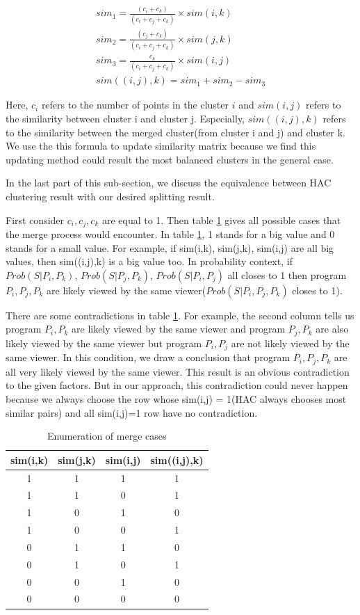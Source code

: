 \begin{equation}
\begin{split}
sim_1 = \frac{(c_i+c_k)}{(c_i+c_j+c_k)}\times sim(i,k) \\
sim_2 = \frac{(c_j+c_k)}{(c_i+c_j+c_k)}\times sim(j,k) \\
sim_3 = \frac{c_k}{(c_i+c_j+c_k)}\times sim(i,j) \\
sim((i,j),k) = sim_1 + sim_2 - sim_3
\end{split}
\end{equation}

Here, $c_i$ refers to the number of points in the cluster $i$ and $sim(i,j)$ refers to the similarity between cluster i and cluster j. Especially, $sim((i,j),k)$ refers
to the similarity between the merged cluster(from cluster i and j) and cluster k. We use the this formula to update similarity matrix because we find this updating
method could result the most balanced clusters in the general case.

In the last part of this sub-section, we discuss the equivalence between HAC clustering result with our desired splitting result.

First consider $c_i,c_j,c_k$ are equal to 1. Then table \ref{tbl:2} gives all possible cases that the merge process would encounter.
In table \ref{tbl:2}, 1 stands for a big value and 0 stands for a small value. For example, if sim(i,k), sim(j,k), sim(i,j) are all
big values, then sim((i,j),k) is a big value too. In probability context, if $Prob(S|P_i,P_k)$, $Prob(S|P_j,P_k)$, $Prob(S|P_i,P_j)$
all closes to 1 then program $P_i,P_j,P_k$ are likely viewed by the same viewer($Prob(S|P_i,P_j,P_k)$ closes to 1).

There are some contradictions in table \ref{tbl:2}. For example, the second column tells us program $P_i,P_k$ are likely viewed by
the same viewer and program $P_j,P_k$ are also likely viewed by the same viewer but program $P_i,P_j$ are not likely viewed
by the same viewer. In this condition, we draw a conclusion that program $P_i,P_j,P_k$ are all very likely viewed by the same viewer.
This result is an obvious contradiction to the given factors. But in our approach, this contradiction could never happen because
we always choose the row whose sim(i,j) = 1(HAC always chooses most similar pairs) and all sim(i,j)=1 row have no contradiction.

\begin{table}
\centering
\begin{tabular}{|c||c||c||c|}
\hline
sim(i,k) & sim(j,k) & sim(i,j) & sim((i,j),k) \\
\hline
1 & 1 & 1 & 1 \\
\hline
1 & 1 & 0 & 1 \\
\hline
1 & 0 & 1 & 0 \\
\hline
1 & 0 & 0 & 1 \\
\hline
0 & 1 & 1 & 0 \\
\hline
0 & 1 & 0 & 1 \\
\hline
0 & 0 & 1 & 0 \\
\hline
0 & 0 & 0 & 0 \\
\hline
\end{tabular}
\caption{Enumeration of merge cases}
\label{tbl:2}
\end{table}

